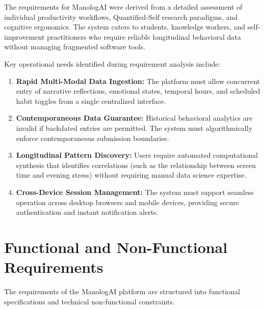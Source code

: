 The requirements for ManologAI were derived from a detailed assessment of individual productivity workflows, Quantified-Self research paradigms, and cognitive ergonomics. The system caters to students, knowledge workers, and self-improvement practitioners who require reliable longitudinal behavioral data without managing fragmented software tools.

Key operational needs identified during requirement analysis include:
\begin{enumerate}
  \item \textbf{Rapid Multi-Modal Data Ingestion:} The platform must allow concurrent entry of narrative reflections, emotional states, temporal hours, and scheduled habit toggles from a single centralized interface.
  \item \textbf{Contemporaneous Data Guarantee:} Historical behavioral analytics are invalid if backdated entries are permitted. The system must algorithmically enforce contemporaneous submission boundaries.
  \item \textbf{Longitudinal Pattern Discovery:} Users require automated computational synthesis that identifies correlations (such as the relationship between screen time and evening stress) without requiring manual data science expertise.
  \item \textbf{Cross-Device Session Management:} The system must support seamless operation across desktop browsers and mobile devices, providing secure authentication and instant notification alerts.
\end{enumerate}

\section{Functional and Non-Functional Requirements}

The requirements of the ManologAI platform are structured into functional specifications and technical non-functional constraints.

